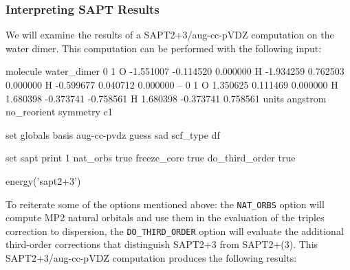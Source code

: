 \subsubsection{Interpreting SAPT Results}

We will examine the results of a SAPT2+3/aug-cc-pVDZ computation on the
water dimer. This computation can be performed with the following 
input:
\begin{Snippet}

molecule water_dimer {
     0 1
     O  -1.551007  -0.114520   0.000000
     H  -1.934259   0.762503   0.000000
     H  -0.599677   0.040712   0.000000
     --
     0 1
     O   1.350625   0.111469   0.000000
     H   1.680398  -0.373741  -0.758561
     H   1.680398  -0.373741   0.758561
     units angstrom
     no_reorient
     symmetry c1
}

set globals {
    basis          aug-cc-pvdz
    guess          sad
    scf_type       df
}

set sapt {
    print          1
    nat_orbs       true
    freeze_core    true
    do_third_order true
}

energy('sapt2+3')

\end{Snippet}
To reiterate some of the options mentioned above: the \texttt{NAT\_ORBS} 
option will compute MP2 natural orbitals and use them in the evaluation of
the triples correction to dispersion, the \texttt{DO\_THIRD\_ORDER} option
will evaluate the additional third-order corrections that distinguish SAPT2+3
from SAPT2+(3). This SAPT2+3/aug-cc-pVDZ computation produces the following 
results:
